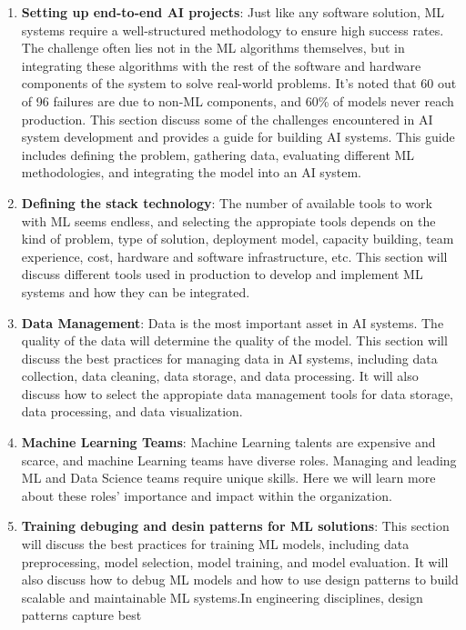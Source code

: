 \documentclass[
  letterpaper,
  DIV=11,
  numbers=noendperiod]{scrreprt}
\begin{document}
\begin{enumerate}
\def\labelenumi{\arabic{enumi}.}
\item
  \textbf{Setting up end-to-end AI projects}: Just like any software
  solution, ML systems require a well-structured methodology to ensure
  high success rates. The challenge often lies not in the ML algorithms
  themselves, but in integrating these algorithms with the rest of the
  software and hardware components of the system to solve real-world
  problems. It's noted that 60 out of 96 failures are due to non-ML
  components, and 60\% of models never reach production. This section
  discuss some of the challenges encountered in AI system development
  and provides a guide for building AI systems. This guide includes
  defining the problem, gathering data, evaluating different ML
  methodologies, and integrating the model into an AI system.
\item
  \textbf{Defining the stack technology}: The number of available tools
  to work with ML seems endless, and selecting the appropiate tools
  depends on the kind of problem, type of solution, deployment model,
  capacity building, team experience, cost, hardware and software
  infrastructure, etc. This section will discuss different tools used in
  production to develop and implement ML systems and how they can be
  integrated.
\item
  \textbf{Data Management}: Data is the most important asset in AI
  systems. The quality of the data will determine the quality of the
  model. This section will discuss the best practices for managing data
  in AI systems, including data collection, data cleaning, data storage,
  and data processing. It will also discuss how to select the appropiate
  data management tools for data storage, data processing, and data
  visualization.
\item
  \textbf{Machine Learning Teams}: Machine Learning talents are
  expensive and scarce, and machine Learning teams have diverse roles.
  Managing and leading ML and Data Science teams require unique skills.
  Here we will learn more about these roles' importance and impact
  within the organization.
\item
  \textbf{Training debuging and desin patterns for ML solutions}: This
  section will discuss the best practices for training ML models,
  including data preprocessing, model selection, model training, and
  model evaluation. It will also discuss how to debug ML models and how
  to use design patterns to build scalable and maintainable ML
  systems.In engineering disciplines, design patterns capture best

\end{enumerate}
\end{document}
